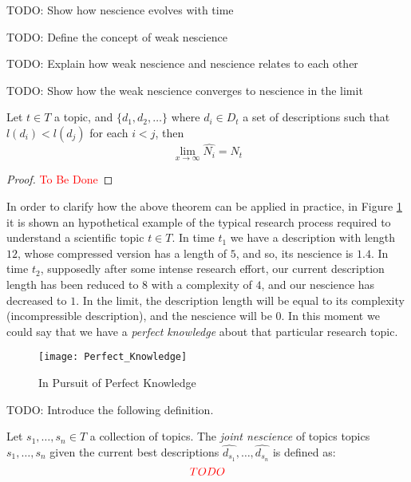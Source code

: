 {\color{red} TODO: Show how nescience evolves with time}

{\color{red} TODO: Define the concept of weak nescience}

{\color{red} TODO: Explain how weak nescience and nescience relates to each other}

{\color{red} TODO: Show how the weak nescience converges to nescience in the limit}

\begin{theorem}
Let $t\in T$ a topic, and $\{d_1, d_2, \ldots \}$ where $d_i \in D_t$ a set of descriptions such that $ l(d_i) < l(d_j)$ for each $i < j$, then
\[
\lim_{x \to \infty} \hat{N_i} = N_t
\]
\end{theorem}
\begin{proof}
\textcolor{red}{To Be Done}
\end{proof}

\begin{example}
In order to clarify how the above theorem can be applied in practice, in Figure \ref{fig:Perfect_Knowledge} it is shown an hypothetical example of the typical research process required to understand a scientific topic $t\in T$. In time $t_{1}$ we have a description with length $12$, whose compressed version has a length of $5$, and so, its nescience is $1.4$. In time $t_{2}$, supposedly after some intense research effort, our current description length has been reduced to $8$ with a complexity of $4$, and our nescience has decreased to $1$. In the limit, the description length will be equal to its complexity (incompressible description), and the nescience will be 0. In this moment we could say that we have a \emph{perfect knowledge} about that particular research topic.
\end{example}

\begin{figure}[h]
\centering\texttt{[image: Perfect\_Knowledge]}
\caption{\label{fig:Perfect_Knowledge}In Pursuit of Perfect Knowledge}
\end{figure}

{\color{red} TODO: Introduce the following definition.}

\begin{definition}
Let $s_{1}, \ldots, s_{n} \in T$ a collection of topics. The \emph{joint nescience} of topics topics $s_{1}, \ldots, s_{n}$ given the current best descriptions $\hat{d_{s_1}}, \ldots, \hat{d_{s_n}}$ is defined as: 
\[
{\color{red} TODO}
\]
\end{definition}

